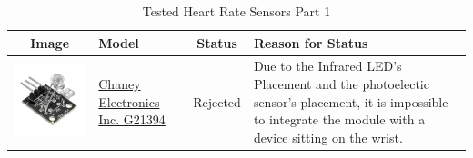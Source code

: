 \documentclass[12pt, titlepage]{article}
\begin{document}
\begin{table}[H]
  \label{HRSensors_Pt1}\caption{Tested Heart Rate Sensors Part 1}
  \begin{tabular}{ | c | m{3cm} | c | m{7cm} |}
    \hline
    \textbf{Image}                              & \textbf{Model}                                                                                                                                                    & \textbf{Status} & \textbf{Reason for Status}                                                                                                                                                                                                                                               \\
    \hline
    \includegraphics[scale = 0.5]{G21394}       & \href{https://secure.sayal.com/STORE2/View_SHOP.php?SKU=247799}{Chaney Electronics Inc. G21394}                                                                   & Rejected        & Due to the Infrared LED's Placement and the photoelectic sensor's placement, it is impossible to integrate the module with a device sitting on the wrist.                                                                                                                \\
    \hline

\end{tabular}
\end{table}
\end{document}
